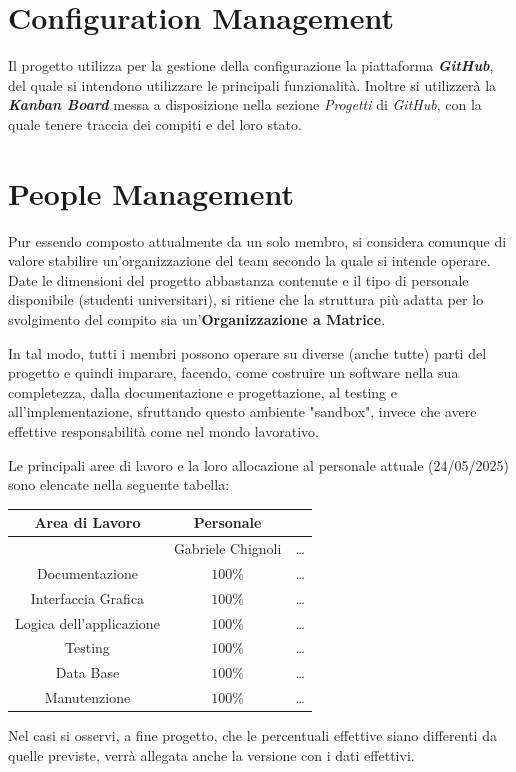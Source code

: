\documentclass{article}
\begin{document}
\section{Configuration Management}
Il progetto utilizza per la gestione della configurazione la piattaforma \textbf{\textit{GitHub}}, del quale si intendono utilizzare le principali funzionalità. Inoltre si utilizzerà la \textbf{\textit{Kanban Board} }messa a disposizione nella sezione \textit{Progetti} di \textit{GitHub}, con la quale tenere traccia dei compiti e del loro stato. 

\section{People Management}
Pur essendo composto attualmente da un solo membro, si considera comunque di valore stabilire un'organizzazione del team secondo la quale si intende operare. Date le dimensioni del progetto abbastanza contenute e il tipo di personale disponibile (studenti universitari), si ritiene che la struttura più adatta per lo svolgimento del compito sia un'\textbf{Organizzazione a Matrice}. 

In tal modo, tutti i membri possono operare su diverse (anche tutte) parti del progetto e quindi imparare, facendo, come costruire un software nella sua completezza, dalla documentazione e progettazione, al testing e all'implementazione, sfruttando questo ambiente "sandbox", invece che avere effettive responsabilità come nel mondo lavorativo. \newline 

Le principali aree di lavoro e la loro allocazione al personale attuale (24/05/2025) sono elencate nella seguente tabella:
\begin{center}
    \begin{longtable}{ccc}
    \toprule
         \textbf{Area di Lavoro} & \textbf{Personale}  & \\
         \midrule
         & Gabriele Chignoli & \dots \\
    \midrule
         Documentazione & $100\%$  & \dots \\
         Interfaccia Grafica & $100\%$ & \dots  \\
         Logica dell'applicazione & $100\%$ & \dots \\
         Testing & $100\%$  & \dots \\
         Data Base & $100\%$  & \dots \\
         Manutenzione & $100\%$ & \dots  \\
    \bottomrule
    \end{longtable}
\end{center}

Nel casi si osservi, a fine progetto, che le percentuali effettive siano differenti da quelle previste, verrà allegata anche la versione con i dati effettivi. 
\end{document}
